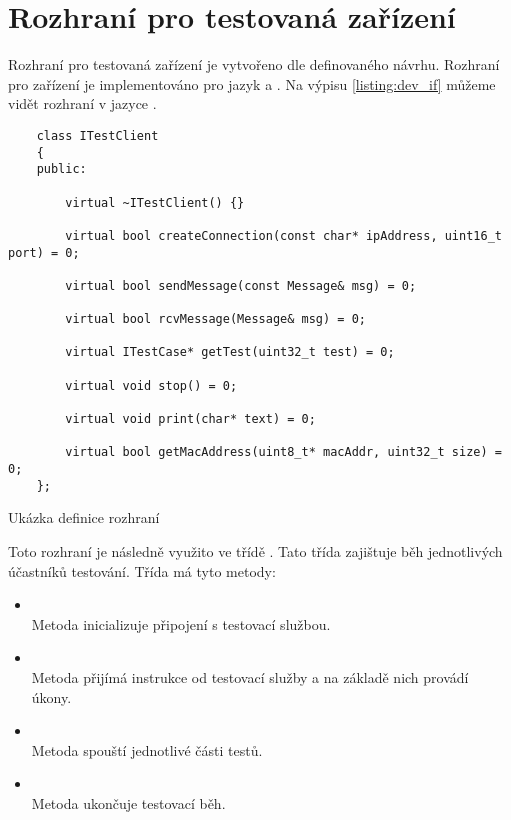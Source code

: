 \section{Rozhraní pro testovaná zařízení}\label{sec:testrunner}

Rozhraní pro testovaná zařízení je vytvořeno dle definovaného návrhu. Rozhraní pro zařízení je implementováno pro jazyk \csharp{} a \cpp{}. Na výpisu \ref{listing:dev_if} můžeme vidět rozhraní v jazyce \cpp{}. 

\begin{listing}[htbp]
    \begin{verbatim}
    class ITestClient
    {
    public:

        virtual ~ITestClient() {}

        virtual bool createConnection(const char* ipAddress, uint16_t port) = 0;
        
        virtual bool sendMessage(const Message& msg) = 0;

        virtual bool rcvMessage(Message& msg) = 0;

        virtual ITestCase* getTest(uint32_t test) = 0;

        virtual void stop() = 0;

        virtual void print(char* text) = 0;

        virtual bool getMacAddress(uint8_t* macAddr, uint32_t size) = 0;
    };
    \end{verbatim}
\caption{Ukázka definice rozhraní}
\label{listing:dev_if}
\end{listing}

Toto rozhraní je následně využito ve třídě . Tato třída zajištuje běh jednotlivých účastníků testování. Třída má tyto metody:

\begin{itemize}
    \item {} \\ Metoda inicializuje připojení s testovací službou.
    \item {} \\ Metoda přijímá instrukce od testovací služby a na základě nich provádí úkony.
    \item {} \\ Metoda spouští jednotlivé části testů. 
    \item {} \\ Metoda ukončuje testovací běh.
\end{itemize}

